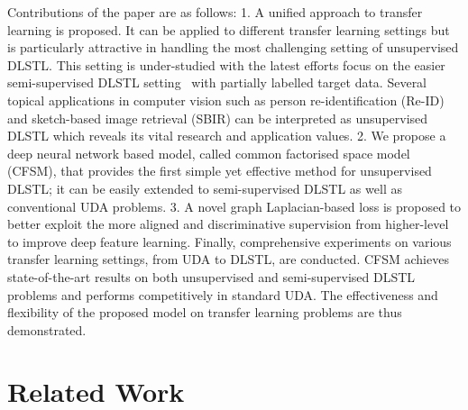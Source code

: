 \documentclass[letterpaper]{article} \usepackage{aaai19}  \usepackage{times}  \usepackage{helvet}  \usepackage{courier}  \usepackage{url}  \usepackage{graphicx}
\begin{document}
Contributions of the paper are as follows: 
1. A unified approach to transfer learning is proposed. It can be applied to different transfer learning settings but is particularly attractive in handling the most challenging  setting of unsupervised DLSTL. This setting is under-studied with the latest efforts focus on the easier semi-supervised DLSTL setting~\cite{label_eff_open_da_2017} with partially labelled target data. Several topical applications in computer vision such as person re-identification (Re-ID) and sketch-based image retrieval (SBIR) can be interpreted as unsupervised DLSTL which reveals its vital research and application values.
2. We propose a deep neural network based model, called common factorised space model (CFSM), that provides the first simple yet effective method for unsupervised DLSTL; it can be easily extended to semi-supervised DLSTL as well as conventional UDA problems.
3. A novel graph Laplacian-based loss is proposed to better exploit the more aligned and discriminative supervision from higher-level to improve deep feature learning.
Finally, comprehensive experiments on various transfer learning settings, from UDA to DLSTL, are conducted. CFSM achieves state-of-the-art results on both unsupervised and semi-supervised DLSTL problems and performs competitively in standard UDA. The effectiveness and flexibility of the proposed model on transfer learning problems are thus demonstrated.









\section{Related Work}\label{Sec:Relate_W}
\begin{comment}
\textcolor{blue}{Echo to the Introduction, we should discuss three main related works. 1. Transfer learning; 2. Deep Hashing; 3. Graph Regularisations.}

\textcolor{blue}{transfer learning follow similar logic in introduction. Describe different problem settings, e.g., fine-tune, UDA, DLSTL (2 settings), and key characteristics of them. Then existing techniques for them. Finally point out that we propose a unified/flexible model for all (may also with some technique contributions).}

\end{comment}
\end{document}
